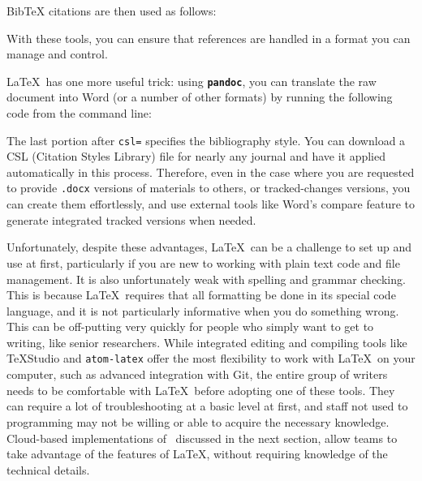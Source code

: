 
\noindent BibTeX citations are then used as follows:


With these tools, you can ensure that references are handled
in a format you can manage and control.\cite{flom2005latex}

\LaTeX\ has one more useful trick:
using \textbf{\texttt{pandoc}},
you can translate the raw document into Word
(or a number of other formats)
by running the following code from the command line:


\noindent The last portion after \texttt{csl=} specifies the bibliography style.
You can download a CSL (Citation Styles Library) file
for nearly any journal and have it applied automatically in this process.
Therefore, even in the case where you are requested to provide
\texttt{.docx} versions of materials to others, or tracked-changes versions,
you can create them effortlessly,
and use external tools like Word's compare feature
to generate integrated tracked versions when needed.

Unfortunately, despite these advantages, \LaTeX\ can be a challenge to set up and use at first,
particularly if you are new to working with plain text code and file management.
It is also unfortunately weak with spelling and grammar checking.
This is because \LaTeX\ requires that all formatting be done in its special code language,
and it is not particularly informative when you do something wrong.
This can be off-putting very quickly for people
who simply want to get to writing, like senior researchers.
While integrated editing and compiling tools like TeXStudio
and \texttt{atom-latex}
offer the most flexibility to work with \LaTeX\ on your computer,
such as advanced integration with Git,
the entire group of writers needs to be comfortable
with \LaTeX\ before adopting one of these tools.
They can require a lot of troubleshooting at a basic level at first,
and staff not used to programming may not be willing or able to acquire the necessary knowledge.
Cloud-based implementations of \LaTex\, discussed in the next section,
allow teams to take advantage of the features of \LaTeX,
without requiring knowledge of the technical details.

